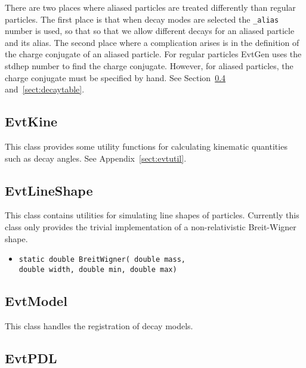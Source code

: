 There are two places where aliased particles are treated differently
than regular particles. The first place is that when decay modes
are selected the {\tt \_alias} number is used, so that
so that we allow different decays for an aliased particle and
its alias. The
second place where a complication arises is in the definition
of the charge conjugate of an aliased particle. For regular 
particles EvtGen uses the stdhep number to find the charge conjugate.
However, for aliased particles, the charge conjugate must be
specified by hand. See Section~\ref{sect:evtpdl}
and~\ref{sect:decaytable}.


\subsection{EvtKine}

This class provides some utility functions for calculating 
kinematic quantities such as decay angles. See Appendix~\ref{sect:evtutil}.



\subsection{EvtLineShape}

This class contains utilities for simulating line shapes of particles.
Currently this class only provides the trivial implementation of a
non-relativistic Breit-Wigner shape.

\begin{itemize}
\item {\tt static double BreitWigner( double mass,}\\
      {\tt double width, double min, double max)}
\end{itemize}


\subsection{EvtModel}

This class handles the registration of decay models.



\subsection{EvtPDL}
\label{sect:evtpdl}

